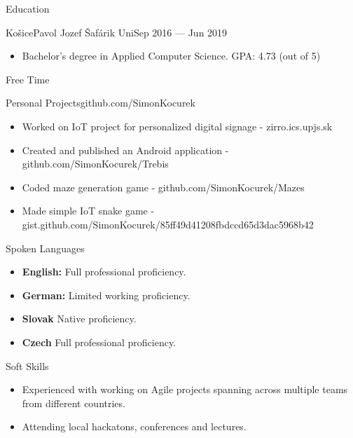 \documentclass[]{style}
\begin{document}
	\begin{cvsection}{Education}
		\begin{cvsubsection}{Košice}{Pavol Jozef Šafárik Uni}{Sep 2016 — Jun 2019}
			\begin{itemize}
				\item Bachelor's degree in Applied Computer Science. GPA: 4.73 (out of 5)
			\end{itemize}
		\end{cvsubsection}
	\end{cvsection}
	
	\begin{cvsection}{Free Time}
	    \begin{cvsubsection}{Personal Projects}{}{github.com/SimonKocurek}
			\begin{itemize}
			    \item Worked on IoT project for personalized digital signage - zirro.ics.upjs.sk
			    \item Created and published an Android application - github.com/SimonKocurek/Trebis
			    \item Coded maze generation game - github.com/SimonKocurek/Mazes
			    \item Made simple IoT snake game - gist.github.com/SimonKocurek/85ff49d41208fbdccd65d3dac5968b42
			\end{itemize}
		\end{cvsubsection}

	\end{cvsection}
	
	\begin{cvsection}{Spoken Languages}
		\begin{cvsubsection}{}{}{}	
			\begin{itemize}
                \item \textbf{English:} Full professional proficiency.
                \item \textbf{German:} Limited working proficiency.
                \item \textbf{Slovak} Native proficiency.
                \item \textbf{Czech} Full professional proficiency.
			\end{itemize}
		\end{cvsubsection}
	\end{cvsection}
	
	\begin{cvsection}{Soft Skills}
		\begin{cvsubsection}{}{}{}	
			\begin{itemize}
                \item Experienced with working on Agile projects spanning across multiple teams from different countries.
                \item Attending local hackatons, conferences and lectures.
			\end{itemize}
		\end{cvsubsection}
	\end{cvsection}
	
	
\end{document}
